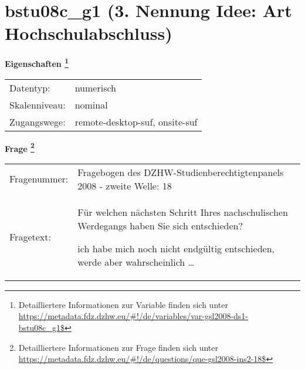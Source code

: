 
    \setcounter{footnote}{0}

    \vspace*{-1.8cm}
	\section{bstu08c\_g1 (3. Nennung Idee: Art Hochschulabschluss)}
	\label{section:bstu08c_g1}



    \vspace*{0.5cm}
    \noindent\textbf{Eigenschaften
	\footnote{Detailliertere Informationen zur Variable finden sich unter
		\url{https://metadata.fdz.dzhw.eu/\#!/de/variables/var-gsl2008-ds1-bstu08c_g1$}}}\\
	\begin{tabularx}{\hsize}{@{}lX}
	Datentyp: & numerisch \\
	Skalenniveau: & nominal \\
	Zugangswege: &
	  remote-desktop-suf, 
	  onsite-suf
 \\
    \end{tabularx}



				\vspace*{0.5cm}
                \noindent\textbf{Frage
	                \footnote{Detailliertere Informationen zur Frage finden sich unter
		              \url{https://metadata.fdz.dzhw.eu/\#!/de/questions/que-gsl2008-ins2-18$}}}\\
				\begin{tabularx}{\hsize}{@{}lX}
					Fragenummer: &
					  Fragebogen des DZHW-Studienberechtigtenpanels 2008 - zweite Welle:
					  18
 \\
					Fragetext: & Für welchen nächsten Schritt Ihres nachschulischen Werdegangs haben Sie sich entschieden?\par  ich habe mich noch nicht endgültig entschieden, werde aber wahrscheinlich … \\
				\end{tabularx}






